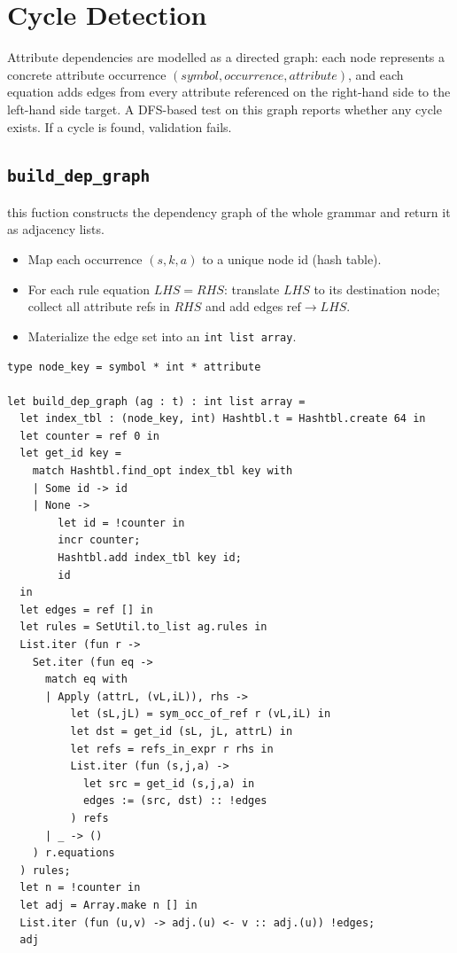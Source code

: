 \section{Cycle Detection}
Attribute dependencies are modelled as a directed graph: each node represents a concrete attribute occurrence 
\((\textit{symbol}, \textit{occurrence}, \textit{attribute})\), and each equation adds edges from every attribute referenced on the right-hand 
side to the left-hand side target. A DFS-based test on this graph reports whether any cycle exists. If a cycle is found, validation fails. 

\subsection{\texttt{build\_dep\_graph}}
this fuction constructs the dependency graph of the whole grammar and return it as adjacency lists. 

\begin{itemize}
  \item Map each occurrence \((s, k, a)\) to a unique node id (hash table). 
  \item For each rule equation \(LHS = RHS\): translate \(LHS\) to its destination node; collect all attribute refs in \(RHS\) and add edges \(\text{ref} \to LHS\). 
  \item Materialize the edge set into an \texttt{int list array}. 
\end{itemize}

\begin{verbatim}
type node_key = symbol * int * attribute

let build_dep_graph (ag : t) : int list array =
  let index_tbl : (node_key, int) Hashtbl.t = Hashtbl.create 64 in
  let counter = ref 0 in
  let get_id key =
    match Hashtbl.find_opt index_tbl key with
    | Some id -> id
    | None ->
        let id = !counter in
        incr counter;
        Hashtbl.add index_tbl key id;
        id
  in
  let edges = ref [] in
  let rules = SetUtil.to_list ag.rules in
  List.iter (fun r ->
    Set.iter (fun eq ->
      match eq with
      | Apply (attrL, (vL,iL)), rhs ->
          let (sL,jL) = sym_occ_of_ref r (vL,iL) in
          let dst = get_id (sL, jL, attrL) in
          let refs = refs_in_expr r rhs in
          List.iter (fun (s,j,a) ->
            let src = get_id (s,j,a) in
            edges := (src, dst) :: !edges
          ) refs
      | _ -> ()
    ) r.equations
  ) rules;
  let n = !counter in
  let adj = Array.make n [] in
  List.iter (fun (u,v) -> adj.(u) <- v :: adj.(u)) !edges;
  adj
\end{verbatim}

